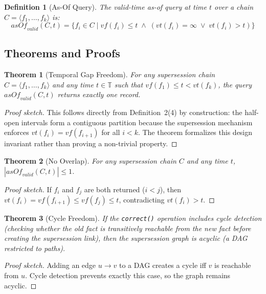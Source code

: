 \documentclass[11pt]{article}
\newtheorem{theorem}{Theorem}
\newtheorem{definition}{Definition}
\begin{document}
\begin{definition}[As-Of Query]
The \emph{valid-time as-of query} at time $t$ over a chain $C = \langle f_1, \ldots, f_k \rangle$ is:
\[
\mathit{asOf}_{\mathit{valid}}(C, t) = \{f_i \in C \mid \mathit{vf}(f_i) \leq t \;\wedge\; (\mathit{vt}(f_i) = \infty \;\vee\; \mathit{vt}(f_i) > t)\}
\]
\end{definition}

\subsection{Theorems and Proofs}

\begin{theorem}[Temporal Gap Freedom]
\label{thm:gapfree}
For any supersession chain $C = \langle f_1, \ldots, f_k \rangle$ and any time $t \in \mathbb{T}$ such that $\mathit{vf}(f_1) \leq t < \mathit{vt}(f_k)$, the query $\mathit{asOf}_{\mathit{valid}}(C, t)$ returns exactly one record.
\end{theorem}

\begin{proof}[Proof sketch]
This follows directly from Definition~2(4) by construction: the half-open intervals form a contiguous partition because the supersession mechanism enforces $\mathit{vt}(f_i) = \mathit{vf}(f_{i+1})$ for all $i < k$. The theorem formalizes this design invariant rather than proving a non-trivial property.
\end{proof}

\begin{theorem}[No Overlap]
\label{thm:nooverlap}
For any supersession chain $C$ and any time $t$, $|\mathit{asOf}_{\mathit{valid}}(C, t)| \leq 1$.
\end{theorem}

\begin{proof}[Proof sketch]
If $f_i$ and $f_j$ are both returned ($i < j$), then $\mathit{vt}(f_i) = \mathit{vf}(f_{i+1}) \leq \mathit{vf}(f_j) \leq t$, contradicting $\mathit{vt}(f_i) > t$.
\end{proof}

\begin{theorem}[Cycle Freedom]
\label{thm:cyclefree}
If the \texttt{correct()} operation includes cycle detection (checking whether the old fact is transitively reachable from the new fact before creating the supersession link), then the supersession graph is acyclic (a DAG restricted to paths).
\end{theorem}

\begin{proof}[Proof sketch]
Adding an edge $u \to v$ to a DAG creates a cycle iff $v$ is reachable from $u$. Cycle detection prevents exactly this case, so the graph remains acyclic.
\end{proof}
\end{document}

